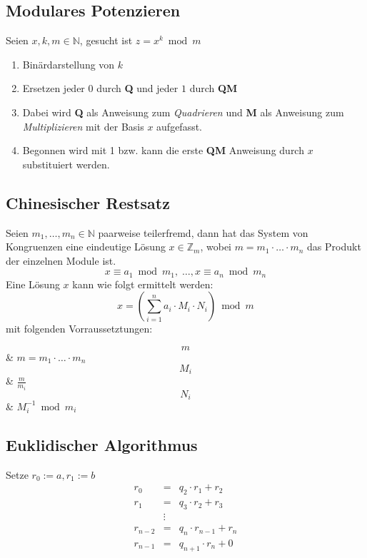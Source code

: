 \documentclass[a4paper,landscape]{article}
\makeatletter
\newenvironment{definitions}{
	\par\vspace{\abovedisplayshortskip}\noindent
	\tabularx{\columnwidth}{>{$}l<{$} @{${}={}$} >{\raggedright\arraybackslash}X}
}{\endtabularx\par\vspace{\belowdisplayshortskip}}
\makeatother
\begin{document}
\begin{multicols*}{4}
	\subsection{Modulares Potenzieren}
	Seien \(x,k,m \in\mathbb{N}\), gesucht ist \(z = x^{k} \bmod m\)
	\begin{enumerate}
		\item Binärdarstellung von \(k\)
		\item Ersetzen jeder \(0\) durch \textbf{Q} und jeder \(1\) durch
		      \textbf{QM}
		\item Dabei wird \textbf{Q} als Anweisung zum \emph{Quadrieren} und
		      \textbf{M} als Anweisung zum \emph{Multiplizieren} mit der Basis \(x\)
		      aufgefasst.
		\item Begonnen wird mit 1 bzw. kann die erste \textbf{QM} Anweisung
		      durch \(x\) substituiert werden.
	\end{enumerate}

	\subsection{Chinesischer Restsatz}
	Seien \(m_{1}, \ldots, m_{n} \in\mathbb{N}\) paarweise teilerfremd, dann hat
	das System von Kongruenzen eine eindeutige Lösung \(x \in \mathbb{Z}_{m}\),
	wobei \(m = m_{1} \cdot \ldots \cdot m_{n}\) das Produkt der einzelnen Module
	ist. \[x \equiv a_{1} \bmod m_{1}, \;\ldots, x \equiv a_{n} \bmod m_{n}\]
	Eine Lösung $x$ kann wie folgt ermittelt werden:
	\[x = \left( \sum_{i = 1}^{n} a_{i} \cdot M_{i} \cdot N_{i} \right) \bmod m\]
	mit folgenden Vorraussetztungen:
	\begin{definitions}
		$$m$$ & $m = m_{1} \cdot \ldots \cdot m_{n}$ \\
		$$M_{i}$$ & $\frac{m}{m_{i}}$ \\
		$$N_{i}$$ & $M_{i}^{-1} \bmod m_{i}$
	\end{definitions}

	\subsection{Euklidischer Algorithmus}
	Setze $r_{0} := a, r_{1} := b$
	\begin{eqnarray*}
		r_{0} &=& q_2 \cdot r_{1} + r_{2} \\
		r_{1} &=& q_3 \cdot r_{2} + r_{3} \\
		&\vdots& \\
		r_{n-2} &=& q_{n} \cdot r_{n-1} + r_{n} \\
		r_{n-1} &=& q_{n+1} \cdot r_{n} + 0
	\end{eqnarray*}

\end{multicols*}
\end{document}
